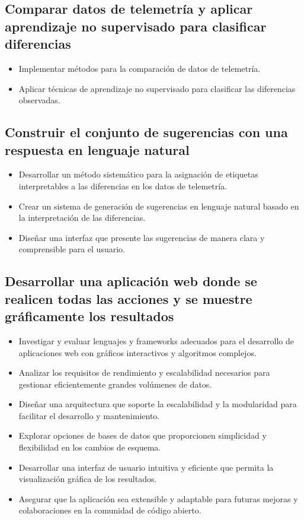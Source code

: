\subsection{Comparar datos de telemetría y aplicar aprendizaje no supervisado para clasificar diferencias}
\begin{itemize}
    \item Implementar métodos para la comparación de datos de telemetría.
    \item Aplicar técnicas de aprendizaje no supervisado para clasificar las diferencias observadas.
\end{itemize}

\subsection{Construir el conjunto de sugerencias con una respuesta en lenguaje natural}
\begin{itemize}
    \item Desarrollar un método sistemático para la asignación de etiquetas interpretables a las diferencias en los datos de telemetría.
    \item Crear un sistema de generación de sugerencias en lenguaje natural basado en la interpretación de las diferencias.
    \item Diseñar una interfaz que presente las sugerencias de manera clara y comprensible para el usuario.
\end{itemize}

\subsection{Desarrollar una aplicación web donde se realicen todas las acciones y se muestre gráficamente los resultados}
\begin{itemize}
    \item Investigar y evaluar lenguajes y frameworks adecuados para el desarrollo de aplicaciones web con gráficos interactivos y algoritmos complejos.
    \item Analizar los requisitos de rendimiento y escalabilidad necesarios para gestionar eficientemente grandes volúmenes de datos.
    \item Diseñar una arquitectura que soporte la escalabilidad y la modularidad para facilitar el desarrollo y mantenimiento.
    \item Explorar opciones de bases de datos que proporcionen simplicidad y flexibilidad en los cambios de esquema.
    \item Desarrollar una interfaz de usuario intuitiva y eficiente que permita la visualización gráfica de los resultados.
    \item Asegurar que la aplicación sea extensible y adaptable para futuras mejoras y colaboraciones en la comunidad de código abierto.
    
\end{itemize}



